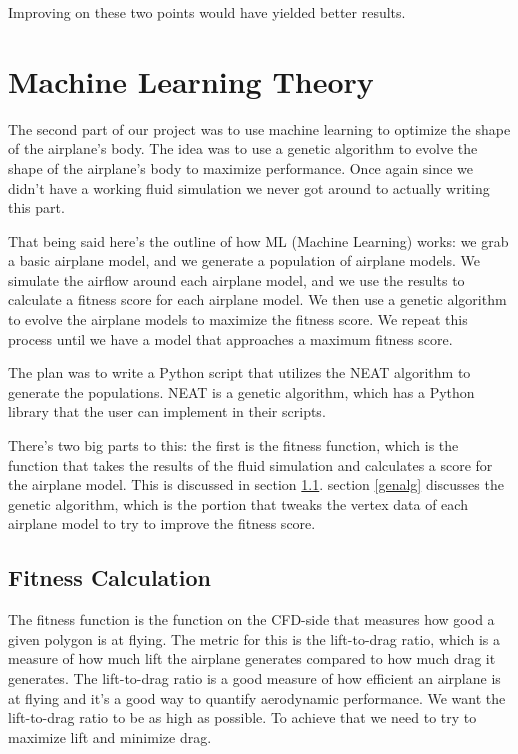 \documentclass[a4paper,12pt,titlepage]{article}
\begin{document}
Improving on these two points would have yielded better results.

\pagebreak
\section{Machine Learning Theory}
The second part of our project was to use machine learning to optimize the shape
of the airplane's body. The idea was to use a genetic algorithm to evolve the
shape of the airplane's body to maximize performance. Once again since we didn't
have a working fluid simulation we never got around to actually writing this part.

That being said here's the outline of how ML (Machine Learning) works: we grab
a basic airplane model, and we generate a population of airplane models. We
simulate the airflow around each airplane model, and we use the results to calculate
a fitness score for each airplane model. We then use a genetic algorithm to evolve
the airplane models to maximize the fitness score. We repeat this process until
we have a model that approaches a maximum fitness score.

The plan was to write a Python script that utilizes the NEAT algorithm to generate
the populations. NEAT is a genetic algorithm, which has a Python library that
the user can implement in their scripts.

There's two big parts to this: the first is the fitness function, which is the
function that takes the results of the fluid simulation and calculates a score
for the airplane model. This is discussed in section \ref{fitness}.
section \ref{genalg} discusses the genetic algorithm, which is the portion that tweaks
the vertex data of each airplane model to try to improve the fitness score.

\subsection{Fitness Calculation} \label{fitness}
The fitness function is the function on the CFD-side that measures how good a
given polygon is at flying. The metric for this is the lift-to-drag ratio, which
is a measure of how much lift the airplane generates compared to how much drag
it generates. The lift-to-drag ratio is a good measure of how efficient an airplane
is at flying and it's a good way to quantify aerodynamic performance. We want the
lift-to-drag ratio to be as high as possible. To achieve that we need to try
to maximize lift and minimize drag.
\end{document}
